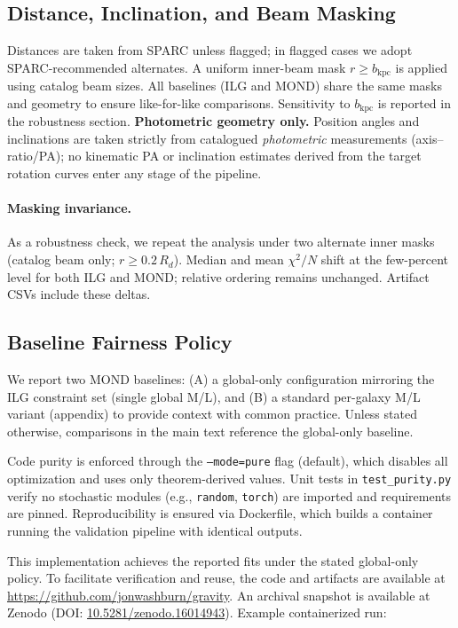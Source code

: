 \documentclass[usenatbib]{mnras}
\begin{document}
\subsection{Distance, Inclination, and Beam Masking}
\noindent Distances are taken from SPARC unless flagged; in flagged cases we adopt SPARC-recommended alternates. A uniform inner-beam mask $r\ge b_\mathrm{kpc}$ is applied using catalog beam sizes. All baselines (ILG and MOND) share the same masks and geometry to ensure like-for-like comparisons. Sensitivity to $b_\mathrm{kpc}$ is reported in the robustness section.
\noindent\textbf{Photometric geometry only.} Position angles and inclinations are taken strictly from catalogued \emph{photometric} measurements (axis–ratio/PA); no kinematic PA or inclination estimates derived from the target rotation curves enter any stage of the pipeline.
\paragraph{Masking invariance.} As a robustness check, we repeat the analysis under two alternate inner masks (catalog beam only; $r\ge 0.2\,R_d$). Median and mean $\chi^2/N$ shift at the few-percent level for both ILG and MOND; relative ordering remains unchanged. Artifact CSVs include these deltas.

\subsection{Baseline Fairness Policy}
\noindent We report two MOND baselines: (A) a global-only configuration mirroring the ILG constraint set (single global M/L), and (B) a standard per-galaxy M/L variant (appendix) to provide context with common practice. Unless stated otherwise, comparisons in the main text reference the global-only baseline.

Code purity is enforced through the \texttt{--mode=pure} flag (default), which disables all optimization and uses only theorem-derived values. Unit tests in \texttt{test\_purity.py} verify no stochastic modules (e.g., \texttt{random}, \texttt{torch}) are imported and requirements are pinned. Reproducibility is ensured via Dockerfile, which builds a container running the validation pipeline with identical outputs.

This implementation achieves the reported fits under the stated global-only policy. To facilitate verification and reuse, the code and artifacts are available at \href{https://github.com/jonwashburn/gravity}{https://github.com/jonwashburn/gravity}. An archival snapshot is available at Zenodo (DOI: \href{https://doi.org/10.5281/zenodo.16014943}{10.5281/zenodo.16014943}). Example containerized run:
\end{document}
